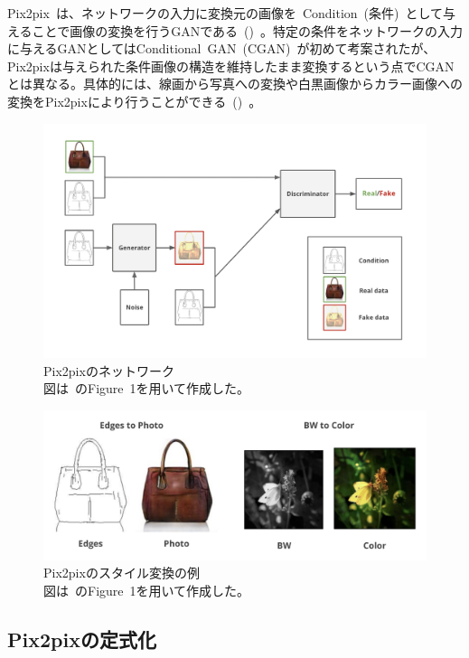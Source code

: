 Pix2pix~\cite{pix2pix}は、ネットワークの入力に変換元の画像を~Condition~(条件)~として与えることで画像の変換を行うGANである~()~。特定の条件をネットワークの入力に与えるGANとしてはConditional~GAN~(CGAN)~\cite{CGAN}が初めて考案されたが、Pix2pixは与えられた条件画像の構造を維持したまま変換するという点でCGANとは異なる。具体的には、線画から写真への変換や白黒画像からカラー画像への変換をPix2pixにより行うことができる~()~。

\begin{figure}[b]
\centering
\includegraphics[width=0.9\hsize]{figure/pix2pix_net.png}
\caption[Pix2pixのネットワーク]{Pix2pixのネットワーク\\
図は~\cite{pix2pix}のFigure~1を用いて作成した。}
\label{fig:pix2pix_net}
\end{figure}

\clearpage

\begin{figure}[t]
\centering
\includegraphics[width=\hsize]{figure/pix2pix_img.png}
\caption[Pix2pixのスタイル変換の例]{Pix2pixのスタイル変換の例\\
図は~\cite{pix2pix}のFigure~1を用いて作成した。}
\label{fig:pix2pix_img}
\end{figure}

\subsection{Pix2pixの定式化}

